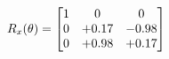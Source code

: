 \documentclass[preview]{standalone}
\begin{document}
\begin{align*}
\special{dvisvgm:raw <g id='unique000'>}R_{x}(\theta) = \begin{bmatrix}1 & 0 & 0 \\0 & +0.17 & -0.98 \\0 & +0.98 & +0.17\end{bmatrix}\special{dvisvgm:raw </g>}
\end{align*}
\end{document}
